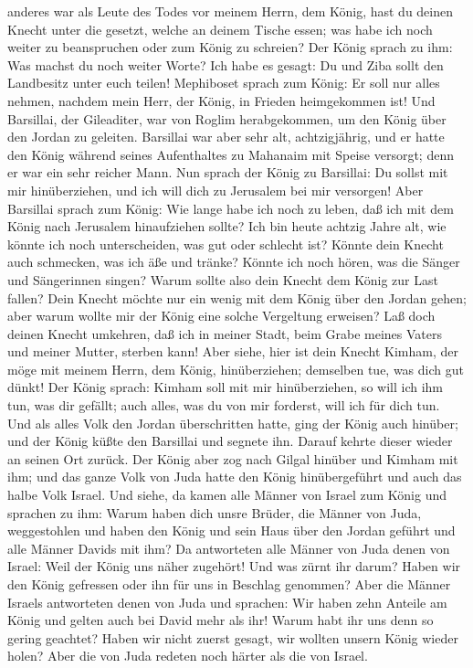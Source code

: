 anderes war als Leute des Todes vor meinem Herrn, dem König, hast du
deinen Knecht unter die gesetzt, welche an deinem Tische essen; was habe
ich noch weiter zu beanspruchen oder zum König zu schreien?
 Der König sprach zu ihm: Was machst du noch weiter
Worte? Ich habe es gesagt: Du und Ziba sollt den Landbesitz unter euch
teilen!  Mephiboset sprach zum König: Er soll nur alles
nehmen, nachdem mein Herr, der König, in Frieden heimgekommen ist!
 Und Barsillai, der Gileaditer, war von Roglim
herabgekommen, um den König über den Jordan zu geleiten. 
Barsillai war aber sehr alt, achtzigjährig, und er hatte den König
während seines Aufenthaltes zu Mahanaim mit Speise versorgt; denn er war
ein sehr reicher Mann.  Nun sprach der König zu
Barsillai: Du sollst mit mir hinüberziehen, und ich will dich zu
Jerusalem bei mir versorgen!  Aber Barsillai sprach zum
König: Wie lange habe ich noch zu leben, daß ich mit dem König nach
Jerusalem hinaufziehen sollte?  Ich bin heute achtzig
Jahre alt, wie könnte ich noch unterscheiden, was gut oder schlecht ist?
Könnte dein Knecht auch schmecken, was ich äße und tränke? Könnte ich
noch hören, was die Sänger und Sängerinnen singen? Warum sollte also
dein Knecht dem König zur Last fallen?  Dein Knecht
möchte nur ein wenig mit dem König über den Jordan gehen; aber warum
wollte mir der König eine solche Vergeltung erweisen? 
Laß doch deinen Knecht umkehren, daß ich in meiner Stadt, beim Grabe
meines Vaters und meiner Mutter, sterben kann! Aber siehe, hier ist dein
Knecht Kimham, der möge mit meinem Herrn, dem König, hinüberziehen;
demselben tue, was dich gut dünkt!  Der König sprach:
Kimham soll mit mir hinüberziehen, so will ich ihm tun, was dir gefällt;
auch alles, was du von mir forderst, will ich für dich tun.
 Und als alles Volk den Jordan überschritten hatte, ging
der König auch hinüber; und der König küßte den Barsillai und segnete
ihn. Darauf kehrte dieser wieder an seinen Ort zurück. 
Der König aber zog nach Gilgal hinüber und Kimham mit ihm; und das ganze
Volk von Juda hatte den König hinübergeführt und auch das halbe Volk
Israel.  Und siehe, da kamen alle Männer von Israel zum
König und sprachen zu ihm: Warum haben dich unsre Brüder, die Männer von
Juda, weggestohlen und haben den König und sein Haus über den Jordan
geführt und alle Männer Davids mit ihm?  Da antworteten
alle Männer von Juda denen von Israel: Weil der König uns näher
zugehört! Und was zürnt ihr darum? Haben wir den König gefressen oder
ihn für uns in Beschlag genommen?  Aber die Männer
Israels antworteten denen von Juda und sprachen: Wir haben zehn Anteile
am König und gelten auch bei David mehr als ihr! Warum habt ihr uns denn
so gering geachtet? Haben wir nicht zuerst gesagt, wir wollten unsern
König wieder holen? Aber die von Juda redeten noch härter als die von
Israel.


